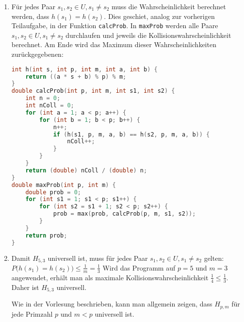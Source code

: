 \documentclass[11pt,a4paper]{article}
\begin{document}
\begin{loesung}
\begin{enumerate}
        \item 
        Für jedes Paar $s_1, s_2 \in U, s_1 \neq s_2$ muss die Wahrscheinlichkeit berechnet werden, dass $h(s_1) = h(s_2)$.
        Dies geschiet, analog zur vorherigen Teilaufgabe, in der Funktion \texttt{calcProb}.
        In \texttt{maxProb} werden alle Paare $s_1, s_2 \in U, s_1 \neq s_2$ durchlaufen und jeweils die Kollisionswahrscheinlichkeit berechnet.
        Am Ende wird das Maximum dieser Wahrscheinlichkeiten zurückgegebenen:
        \begin{lstlisting}[language=c++]
int h(int s, int p, int m, int a, int b) {
    return ((a * s + b) % p) % m;
}
double calcProb(int p, int m, int s1, int s2) {
    int n = 0;
    int nColl = 0;
    for (int a = 1; a < p; a++) {
        for (int b = 1; b < p; b++) {
            n++;
            if (h(s1, p, m, a, b) == h(s2, p, m, a, b)) {
                nColl++;
            }
        }
    }
    return (double) nColl / (double) n;
}
double maxProb(int p, int m) {
    double prob = 0;
    for (int s1 = 1; s1 < p; s1++) {
        for (int s2 = s1 + 1; s2 < p; s2++) {
            prob = max(prob, calcProb(p, m, s1, s2));
        }
    }
    return prob;
}
        \end{lstlisting}
        \item 
        Damit $H_{5, 3}$ universell ist, muss für jedes Paar $s_1, s_2 \in U, s_1 \neq s_2$ gelten: $P\big(h(s_1) = h(s_2)\big) \leq \frac{1}{m} = \frac{1}{3}$
        Wird das Programm auf $p = 5$ und $m = 3$ angewendet, erhält man als maximale Kollisionswahrscheinlichkeit $\frac{1}{4} \leq \frac{1}{3}$.
        Daher ist $H_{5, 3}$ universell.

        Wie in der Vorlesung beschrieben, kann man allgemein zeigen, dass $H_{p, m}$ für jede Primzahl $p$ und $m < p$ universell ist.
    \end{enumerate}
\end{loesung}
\end{document}
